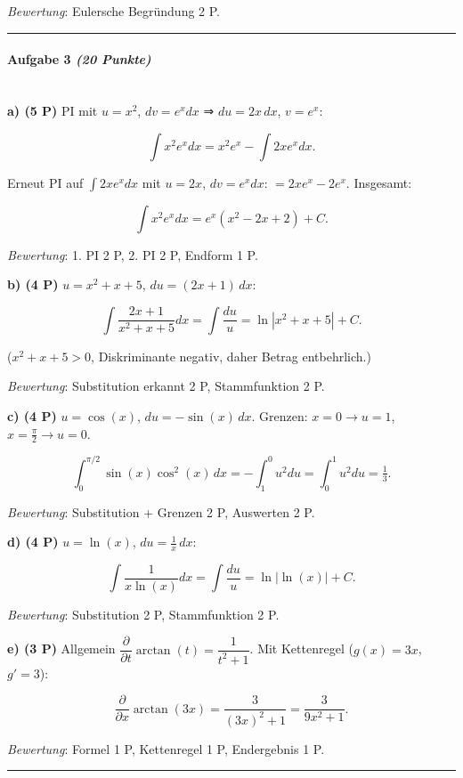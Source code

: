 \documentclass[11pt, a4paper]{article}
\begin{document}
\textit{Bewertung}: Eulersche Begründung 2 P.



\noindent\textcolor{rulegray}{\rule{\linewidth}{0.4pt}}


\paragraph{Aufgabe 3 \textit{(20 Punkte)}}\mbox{}\\[2pt]

\textbf{a) (5 P)} PI mit $u=x^2$, $dv=e^x dx$ ⇒ $du=2x\,dx$, $v=e^x$:

\[
\int x^2 e^x dx = x^2 e^x - \int 2x e^x dx.
\]

Erneut PI auf $\int 2xe^x dx$ mit $u=2x$, $dv=e^x dx$: $= 2xe^x - 2e^x$. Insgesamt:

\[
\int x^2 e^x dx = e^x(x^2-2x+2)+C.
\]

\textit{Bewertung}: 1. PI 2 P, 2. PI 2 P, Endform 1 P.


\textbf{b) (4 P)} $u=x^2+x+5$, $du=(2x+1)\,dx$:

\[
\int \frac{2x+1}{x^2+x+5}dx = \int \frac{du}{u} = \ln|x^2+x+5| + C.
\]

($x^2+x+5>0$, Diskriminante negativ, daher Betrag entbehrlich.)

\textit{Bewertung}: Substitution erkannt 2 P, Stammfunktion 2 P.


\textbf{c) (4 P)} $u=\cos(x)$, $du=-\sin(x)\,dx$. Grenzen: $x=0\to u=1$, $x=\tfrac{\pi}{2}\to u=0$.

\[
\int_0^{\pi/2}\sin(x)\cos^2(x)\,dx = -\int_1^0 u^2 du = \int_0^1 u^2 du = \tfrac{1}{3}.
\]

\textit{Bewertung}: Substitution + Grenzen 2 P, Auswerten 2 P.


\textbf{d) (4 P)} $u=\ln(x)$, $du=\tfrac{1}{x}\,dx$:

\[
\int \frac{1}{x\ln(x)}dx = \int \frac{du}{u} = \ln|\ln(x)| + C.
\]

\textit{Bewertung}: Substitution 2 P, Stammfunktion 2 P.


\textbf{e) (3 P)} Allgemein $\dfrac{\partial}{\partial t}\arctan(t) = \dfrac{1}{t^2+1}$. Mit Kettenregel ($g(x)=3x$, $g'=3$):

\[
\frac{\partial}{\partial x}\arctan(3x) = \frac{3}{(3x)^2+1} = \frac{3}{9x^2+1}.
\]

\textit{Bewertung}: Formel 1 P, Kettenregel 1 P, Endergebnis 1 P.



\noindent\textcolor{rulegray}{\rule{\linewidth}{0.4pt}}
\end{document}
